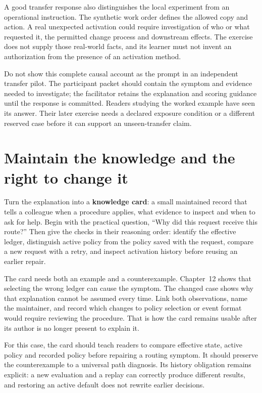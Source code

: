 A good transfer response also distinguishes the local experiment from an operational instruction. The synthetic work order defines the allowed copy and action. A real unexpected activation could require investigation of who or what requested it, the permitted change process and downstream effects. The exercise does not supply those real-world facts, and its learner must not invent an authorization from the presence of an activation method.

Do not show this complete causal account as the prompt in an independent transfer pilot. The participant packet should contain the symptom and evidence needed to investigate; the facilitator retains the explanation and scoring guidance until the response is committed. Readers studying the worked example have seen its answer. Their later exercise needs a declared exposure condition or a different reserved case before it can support an unseen-transfer claim.

\section{Maintain the knowledge and the right to change it}\label{sec:ch13-governance}

Turn the explanation into a \textbf{knowledge card}: a small maintained record that tells a colleague when a procedure applies, what evidence to inspect and when to ask for help. Begin with the practical question, ``Why did this request receive this route?'' Then give the checks in their reasoning order: identify the effective ledger, distinguish active policy from the policy saved with the request, compare a new request with a retry, and inspect activation history before reusing an earlier repair.

The card needs both an example and a counterexample. Chapter~12 shows that selecting the wrong ledger can cause the symptom. The changed case shows why that explanation cannot be assumed every time. Link both observations, name the maintainer, and record which changes to policy selection or event format would require reviewing the procedure. That is how the card remains usable after its author is no longer present to explain it.

For this case, the card should teach readers to compare effective state, active policy and recorded policy before repairing a routing symptom. It should preserve the counterexample to a universal path diagnosis. Its history obligation remains explicit: a new evaluation and a replay can correctly produce different results, and restoring an active default does not rewrite earlier decisions.

